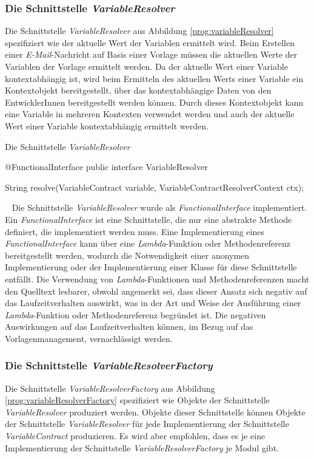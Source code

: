 \subsubsection{Die Schnittstelle \emph{VariableResolver}}
\label{sec:variableResolver}
Die Schnittstelle \emph{VariableResolver} aus Abbildung \ref{prog:variableResolver} spezifiziert wie der aktuelle Wert der Variablen ermittelt wird. Beim Erstellen einer \emph{E-Mail}-Nachricht auf Basis einer Vorlage müssen die aktuellen Werte der Variablen der Vorlage ermittelt werden. 
Da der aktuelle Wert einer Variable kontextabhängig ist, wird beim Ermitteln des aktuellen Werts einer Variable ein Kontextobjekt bereitgestellt, über das kontextabhängige Daten von den  EntwicklerInnen bereitgestellt werden können. Durch dieses Kontextobjekt kann eine Variable in mehreren Kontexten verwendet werden und auch der aktuelle Wert einer Variable kontextabhängig ermittelt werden.
\begin{program}[h]
\caption{Die Schnittstelle \emph{VariableResolver}}
\label{prog:variableResolver}
\begin{JavaCode}
@FunctionalInterface
public interface VariableResolver {

    String resolve(VariableContract variable,
                   VariableContractResolverContext ctx);
}
\end{JavaCode}
\end{program}
\ \newline
Die Schnittstelle \emph{VariableResolver} wurde als \emph{FunctionalInterface} implementiert. Ein \emph{FunctionalInterface} ist eine Schnittstelle, die nur eine abstrakte Methode definiert, die implementiert werden muss. Eine Implementierung eines \emph{FunctionalInterface} kann über eine \emph{Lambda}-Funktion oder Methodenreferenz bereitgestellt werden, wodurch die Notwendigkeit einer anonymen Implementierung oder der Implementierung einer Klasse für diese Schnittstelle entfällt. Die Verwendung von \emph{Lambda}-Funktionen und Methodenreferenzen macht den Quelltext lesbarer, obwohl angemerkt sei, dass dieser Ansatz sich negativ auf das Laufzeitverhalten auswirkt, was in der Art und Weise der Ausführung einer \emph{Lambda}-Funktion oder Methodenreferenz begründet ist. Die negativen Auswirkungen auf das Laufzeitverhalten können, im Bezug auf das Vorlagenmanagement, vernachlässigt werden.

\subsubsection{Die Schnittstelle \emph{VariableResolverFactory}}
\label{sec:variableResolverFactory}
Die Schnittstelle \emph{VariableResolverFactory} aus Abbildung \ref{prog:variableResolverFactory}  spezifiziert wie Objekte der Schnittstelle \emph{VariableResolver} produziert werden. Objekte dieser Schnittstelle können Objekte der Schnittstelle \emph{VariableResolver} für jede Implementierung der Schnittstelle \emph{VariableContract} produzieren. Es wird aber empfohlen, dass es je eine Implementierung der Schnittstelle \emph{VariableResolverFactory} je Modul gibt.

